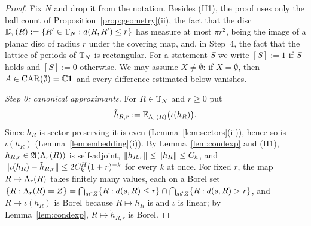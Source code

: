 \begin{proof}
Fix $N$ and drop it from the notation. Besides (H1), the proof uses only the ball count of
Proposition~\ref{prop:geometry}(ii), the fact that the disc $\mathbb D_r(R):=\{R'\in\mathbb{T}_N:d(R,R')\le r\}$ has measure at
most $\pi r^2$, being the image of a planar disc of radius $r$ under the covering map, and, in Step~4, the fact that the
lattice of periods of $\mathbb{T}_N$ is rectangular. For a statement $S$ we write $[S]:=1$ if $S$ holds and $[S]:=0$ otherwise. We may assume
$X\ne\emptyset$: if $X=\emptyset$, then $A\in\mathrm{CAR}(\emptyset)=\mathbb{C}\mathbf{1}$ and every difference estimated below vanishes.

\emph{Step 0: canonical approximants.} For $R\in\mathbb{T}_N$ and $r\ge0$ put
\[
\tilde h_{R,r}:=\mathbb{E}_{\Lambda_{r}(R)}\bigl(\iota(h_R)\bigr).
\]
Since $h_R$ is sector-preserving it is even (Lemma~\ref{lem:sectors}(ii)), hence so is $\iota(h_R)$
(Lemma~\ref{lem:embedding}(i)). By Lemma~\ref{lem:condexp} and (H1), $\tilde h_{R,r}\in\mathfrak{A}(\Lambda_{r}(R))$ is
self-adjoint, $\lVert\tilde h_{R,r}\rVert\le\lVert h_R\rVert\le C_h$, and $\lVert\iota(h_R)-\tilde h_{R,r}\rVert\le2C^H_k(1+r)^{-k}$ for
every $k$ at once. For fixed $r$, the map $R\mapsto\Lambda_{r}(R)$ takes finitely many values, each on a Borel set
$\{R:\Lambda_{r}(R)=Z\}=\bigcap_{s\in Z}\{R:d(s,R)\le r\}\cap\bigcap_{s\notin Z}\{R:d(s,R)>r\}$, and $R\mapsto\iota(h_R)$ is
Borel because $R\mapsto h_R$ is and $\iota$ is linear; by Lemma~\ref{lem:condexp}, $R\mapsto\tilde h_{R,r}$ is Borel.


\end{proof}
